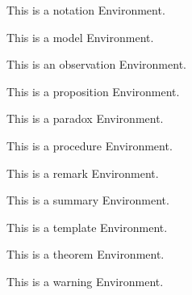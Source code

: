\documentclass{ximera}
\begin{document}
\begin{notation}
    This is a notation Environment.
\end{notation}%
\begin{model}
    This is a model Environment.
\end{model}%
\begin{observation}
    This is an observation Environment.
\end{observation}%
\begin{proposition}
    This is a proposition Environment.
\end{proposition}%
\begin{paradox}
    This is a paradox Environment.
\end{paradox}%
\begin{procedure}
    This is a procedure Environment.
\end{procedure}%
\begin{remark}
    This is a remark Environment.
\end{remark}%
\begin{summary}
    This is a summary Environment.
\end{summary}%
\begin{template}
    This is a template Environment.
\end{template}%
\begin{theorem}
    This is a theorem Environment.
\end{theorem}%
\begin{warning}
    This is a warning Environment.
\end{warning}%

\hrulefill
\end{document}
